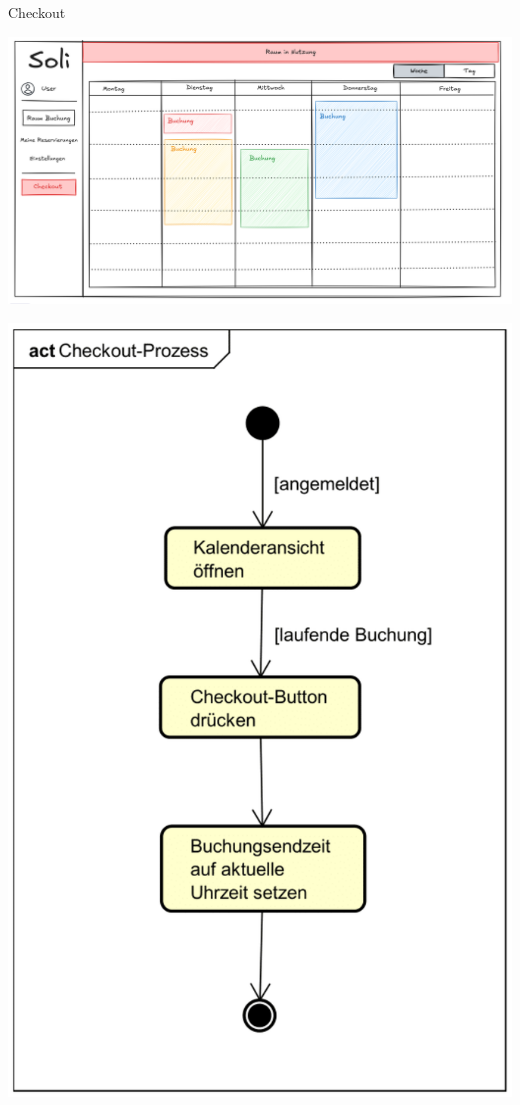 \documentclass{sdqbeamer}
\begin{document}
\begin{frame}{Checkout}
    \begin{minipage}{0.65\textwidth}
        \centering
        \includegraphics[width=\textwidth]{pictures/figures/ui/checkout}
        \label{fig:checkout}
    \end{minipage}
    \begin{minipage}{0.25\textwidth}
        \centering
        \includegraphics[width=\textwidth]{pictures/figures/activity/checkoutprozess}
        \label{fig:checkoutprozess}
    \end{minipage}
\end{frame}
\end{document}
